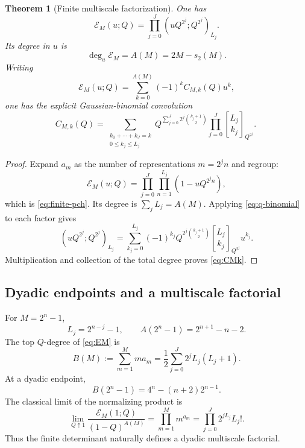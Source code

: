 \documentclass[11pt,oneside]{article}
\numberwithin{equation}{section}
\theoremstyle{plain}
\newtheorem{theorem}{Theorem}[section]
\theoremstyle{definition}
\theoremstyle{remark}
\newcommand{\Ecal}{\mathscr E}
\newcommand{\qbinom}[3]{\genfrac{[}{]}{0pt}{}{#1}{#2}_{#3}}
\begin{document}
\begin{theorem}[Finite multiscale factorization]\label{thm:finite-E}
One has
\begin{equation}\label{eq:finite-pch}
 \boxed{\ \Ecal_M(u;Q)
 =\prod_{j=0}^{J}(uQ^{2^j};Q^{2^j})_{L_j}.\ }
\end{equation}
Its degree in $u$ is
\begin{equation}\label{eq:EM-degree}
 \deg_u\Ecal_M=A(M)=2M-s_2(M).
\end{equation}
Writing
\begin{equation}\label{eq:EM-coeff-def}
 \Ecal_M(u;Q)=\sum_{k=0}^{A(M)}(-1)^kC_{M,k}(Q)u^k,
\end{equation}
one has the explicit Gaussian-binomial convolution
\begin{equation}\label{eq:CMk}
 \boxed{
 C_{M,k}(Q)=
 \sum_{\substack{k_0+\cdots+k_J=k\\0\le k_j\le L_j}}
 Q^{\sum_{j=0}^{J}2^j\binom{k_j+1}{2}}
 \prod_{j=0}^{J}\qbinom{L_j}{k_j}{Q^{2^j}}.\ }
\end{equation}
\end{theorem}

\begin{proof}
Expand $a_m$ as the number of representations $m=2^jn$ and regroup:
\[
 \Ecal_M(u;Q)
 =\prod_{j=0}^{J}\prod_{n=1}^{L_j}(1-uQ^{2^jn}),
\]
which is \cref{eq:finite-pch}.  Its degree is $\sum_jL_j=A(M)$.  Applying \cref{eq:q-binomial} to each factor gives
\[
 (uQ^{2^j};Q^{2^j})_{L_j}
 =\sum_{k_j=0}^{L_j}(-1)^{k_j}
 Q^{2^j\binom{k_j+1}{2}}
 \qbinom{L_j}{k_j}{Q^{2^j}}u^{k_j}.
\]
Multiplication and collection of the total degree proves \cref{eq:CMk}.
\end{proof}

\subsection{Dyadic endpoints and a multiscale factorial}

For $M=2^n-1$,
\begin{equation}\label{eq:dyadic-L}
 L_j=2^{n-j}-1,
 \qquad
 A(2^n-1)=2^{n+1}-n-2.
\end{equation}
The top $Q$-degree of \cref{eq:EM} is
\begin{equation}\label{eq:B-M}
 B(M):=\sum_{m=1}^{M}ma_m
 =\frac12\sum_{j=0}^{J}2^jL_j(L_j+1).
\end{equation}
At a dyadic endpoint,
\begin{equation}\label{eq:B-dyadic}
 B(2^n-1)=4^n-(n+2)2^{n-1}.
\end{equation}
The classical limit of the normalizing product is
\begin{equation}\label{eq:multiscale-factorial}
 \lim_{Q\uparrow1}\frac{\Ecal_M(1;Q)}{(1-Q)^{A(M)}}
 =\prod_{m=1}^{M}m^{a_m}
 =\prod_{j=0}^{J}2^{jL_j}L_j!.
\end{equation}
Thus the finite determinant naturally defines a dyadic multiscale factorial.
\end{document}
